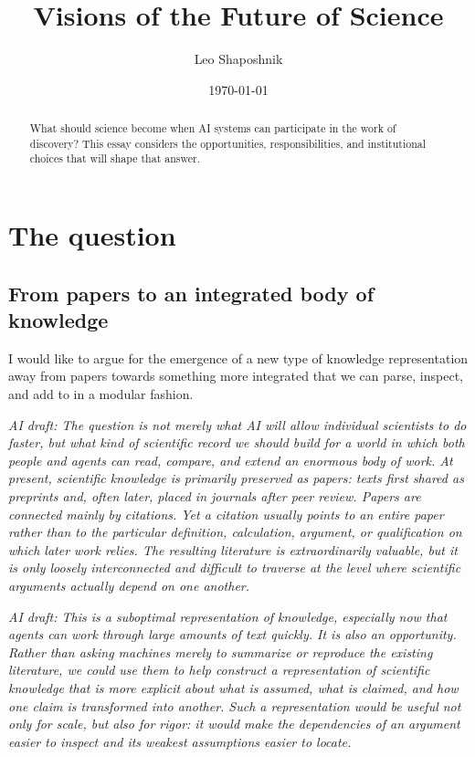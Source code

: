 \documentclass[11pt,a4paper]{article}
\title{Visions of the Future of Science}
\author{Leo Shaposhnik}
\date{\today}
\newcommand{\AI}[1]{{\color{blue}\textit{AI draft: #1}}}
\begin{document}
\maketitle


\begin{abstract}
What should science become when AI systems can participate in the work of
discovery?  This essay considers the opportunities, responsibilities, and
institutional choices that will shape that answer.
\end{abstract}

\section{The question}

\subsection{From papers to an integrated body of knowledge}

I would like to argue for the emergence of a new type of knowledge
representation away from papers towards something more integrated that we can
parse, inspect, and add to in a modular fashion.

\AI{The question is not merely what AI will allow individual scientists to do
faster, but what kind of scientific record we should build for a world in which
both people and agents can read, compare, and extend an enormous body of work.
At present, scientific knowledge is primarily preserved as papers: texts first
shared as preprints and, often later, placed in journals after peer review.
Papers are connected mainly by citations.  Yet a citation usually points to an
entire paper rather than to the particular definition, calculation, argument,
or qualification on which later work relies.  The resulting literature is
extraordinarily valuable, but it is only loosely interconnected and difficult
to traverse at the level where scientific arguments actually depend on one
another.}

\AI{This is a suboptimal representation of knowledge, especially now that
agents can work through large amounts of text quickly.  It is also an
opportunity.  Rather than asking machines merely to summarize or reproduce the
existing literature, we could use them to help construct a representation of
scientific knowledge that is more explicit about what is assumed, what is
claimed, and how one claim is transformed into another.  Such a representation
would be useful not only for scale, but also for rigor: it would make the
dependencies of an argument easier to inspect and its weakest assumptions
easier to locate.}
\end{document}
